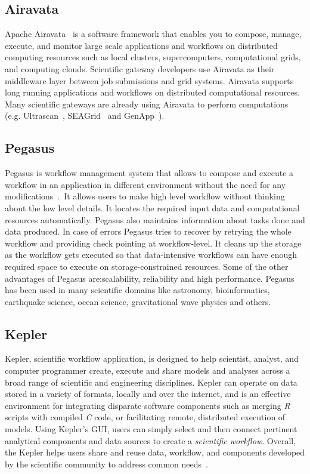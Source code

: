 \subsection{Airavata}

Apache Airavata~\cite{www-airavata} is a software framework that
enables you to compose, manage, execute, and monitor large scale
applications and workflows on distributed computing resources such as
local clusters, supercomputers, computational grids, and computing
clouds. Scientific gateway developers use Airavata as their middleware
layer between job submissions and grid systems. Airavata supports long
running applications and workflows on distributed computational
resources. Many scientific gateways are already using Airavata to
perform computations (e.g. Ultrascan~\cite{www-ultrascan},
SEAGrid~\cite{www-seagrid} and GenApp~\cite{www-genapp}).

   \pv

\subsection{Pegasus}\label{S:pegasus}

Pegasus is workflow management system that allows to compose and
execute a workflow in an application in different environment without
the need for any modifications~\cite{www-Pegasus}. It allows users to
make high level workflow without thinking about the low level
details. It locates the required input data and computational
resources automatically.  Pegasus also maintains information about
tasks done and data produced. In case of errors Pegasus tries to
recover by retrying the whole workflow and providing check pointing at
workflow-level.  It cleans up the storage as the workflow gets
executed so that data-intensive workflows can have enough required
space to execute on storage-constrained resources. Some of the other
advantages of Pegasus are:scalability, reliability and high
performance. Pegasus has been used in many scientific domains like
astronomy, bioinformatics, earthquake science, ocean science,
gravitational wave physics and others.

   \pv


\subsection{Kepler}
 
Kepler, scientific workflow application, is designed to help
scientist, analyst, and computer programmer create, execute and share
models and analyses across a broad range of scientific and engineering
disciplines.  Kepler can operate on data stored in a variety of
formats, locally and over the internet, and is an effective
environment for integrating disparate software components such as
merging \textit{R} scripts with compiled \textit{C} code, or facilitating remote,
distributed execution of models. Using Kepler's GUI, users can simply
select and then connect pertinent analytical components and data
sources to create a \textit{scientific workflow}. Overall, the Kepler helps
users share and reuse data, workflow, and components developed by the
scientific community to address common needs~\cite{www-kepler}.

